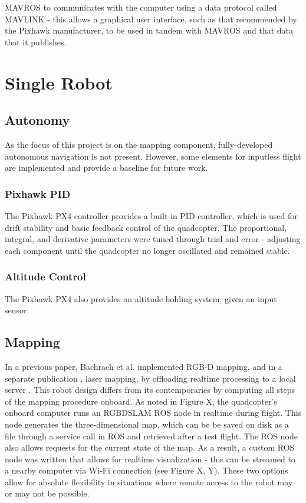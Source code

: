 \documentclass[letterpaper, oneside, 10pt]{report}
\begin{document}

MAVROS to communicates with the computer using a data protocol called MAVLINK - this allows a graphical user interface, such as that recommended by the Pixhawk manufacturer, to be used in tandem with MAVROS and that data that it publishes.

\chapter{Single Robot}

\section{Autonomy}
As the focus of this project is on the mapping component, fully-developed autonomous navigation is not present. However, some elements for inputless flight are implemented and provide a baseline for future work.

    \subsection{Pixhawk PID}
    The Pixhawk PX4 controller provides a built-in PID controller, which is used for drift stability and basic feedback control of the quadcopter. The proportional, integral, and derivative parameters were tuned through trial and error - adjusting each component until the quadcopter no longer oscillated and remained stable.

    \subsection{Altitude Control}

    The Pixhawk PX4 also provides an altitude holding system, given an input sensor.

\section{Mapping}

In a previous paper, Bachrach et al. implemented RGB-D mapping, and in a separate publication \cite{bachrach2011range}, laser mapping, by offloading realtime processing to a local server \cite{bachrach2012estimation}.  This robot design differs from its contemporaries by computing all steps of the mapping procedure onboard. As noted in Figure X, the quadcopter's onboard computer runs an RGBDSLAM ROS node in realtime during flight. This node generates the three-dimensional map, which can be be saved on disk as a file through a service call in ROS and retrieved after a test flight. The ROS node also allows requests for the current state of the map. As a result, a custom ROS node was written that allows for realtime visualization - this can be streamed to a nearby computer via Wi-Fi connection (see Figure X, Y). These two options allow for absolute flexibility in situations where remote access to the robot may or may not be possible.
\end{document}
